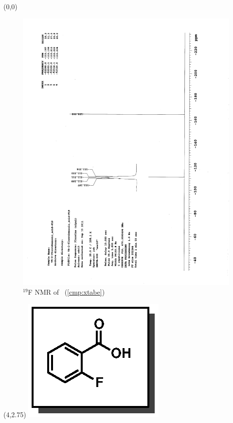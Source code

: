 
\begin{textblock}{20}(0,0)
\begin{figure}[htb]
\caption{$^{19}$F NMR of  \CMPxtabe\ (\ref{cmp:xtabe})}
\includegraphics[scale=0.75, trim = 0mm 0mm 0mm 5mm,
clip]{chp_asymmetric/images/nmr/xtabeF}
\vspace{-100pt}
\end{figure}
\end{textblock}
\begin{textblock}{1}(4,2.75)
\includegraphics[scale=0.8, angle=90]{chp_asymmetric/images/xtabe}
\end{textblock}
\clearpage


